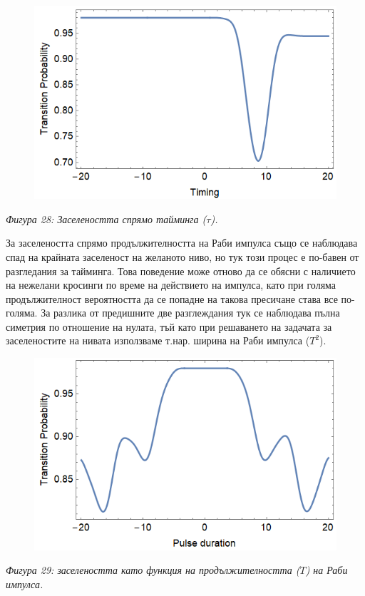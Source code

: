     \begin{figure}[H]
        \centering
        \includegraphics[width=350pt]{30.png}
    \end{figure}
    \begin{center}
        \small \textit{Фигура 28: Заселеността спрямо тайминга ($\tau$).}
    \end{center}

    За заселеността спрямо продължителността на Раби импулса също се наблюдава спад на крайната заселеност на желаното ниво, но тук този процес е по-бавен от разгледания за
    тайминга. Това поведение може отново да се обясни с наличието на нежелани кросинги по време на действието на импулса, като при голяма продължителност вероятността да се
    попадне на такова пресичане става все по-голяма. За разлика от предишните две разглеждания тук се наблюдава пълна симетрия по отношение на нулата, тъй като при решаването
    на задачата за заселеностите на нивата използваме т.нар. ширина на Раби импулса ($T^2$).

    \begin{figure}[H]
        \centering
        \includegraphics[width=350pt]{31.png}
    \end{figure}
    \begin{center}
        \small \textit{Фигура 29: заселеността като функция на продължителността ($T$) на Раби импулса.}
    \end{center}

